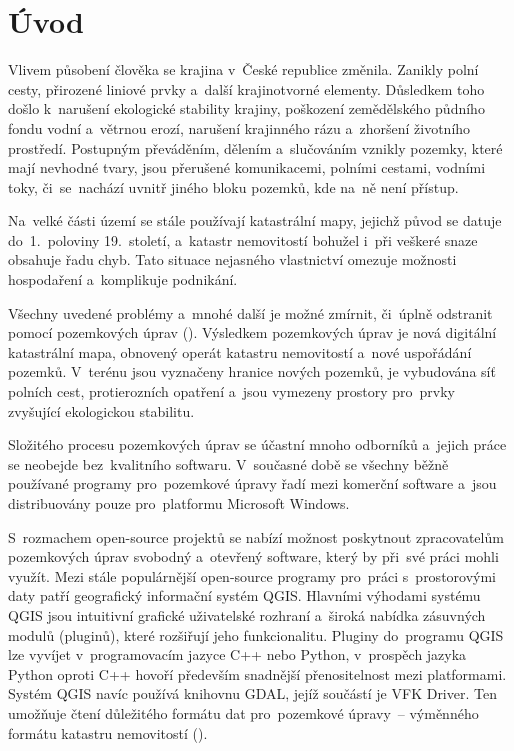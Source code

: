 \chapter{Úvod}
\label{1-uvod}

Vlivem působení člověka se krajina v~České republice změnila. Zanikly
polní cesty, přirozené liniové prvky a~další krajinotvorné
elementy. Důsledkem toho došlo k~naru\-šení ekologické stability
krajiny, poškození zemědělského půdního fondu vodní a~vě\-trnou erozí,
narušení krajinného rázu a~zhoršení životního prostředí. Postupným
převáděním, dělením a~slučováním vznikly pozemky, které mají nevhodné
tvary, jsou přerušené komunikacemi, polními cestami, vodními toky,
či~se~nachází uvnitř jiného bloku pozemků, kde na~ně není přístup.

Na~velké části území se stále používají katastrální mapy, jejichž
původ se datuje do~1.~poloviny 19.~století, a~katastr nemovitostí
bohužel i~při veškeré snaze obsahuje řadu chyb. Tato situace nejasného
vlastnictví omezuje možnosti hospodaření a~komplikuje podnikání.

Všechny uvedené problémy a~mnohé další je možné zmírnit, či~úplně
odstranit pomocí pozemkových úprav (). Výsledkem pozemkových
úprav je nová digi\-tální katastrální mapa, obnovený operát katastru
nemovitostí a~nové uspořádání pozemků. V~terénu jsou vyznačeny hranice
nových pozemků, je vybudována síť polních cest, protierozních opatření
a~jsou vymezeny prostory pro~prvky zvyšující ekologickou stabilitu.

Složitého procesu pozemkových úprav se účastní mnoho odborníků
a~jejich práce se neobejde bez~kvalitního softwaru. V~současné době se
všechny běžně používané programy pro~pozemkové úpravy řadí mezi
komerční software a~jsou distribuovány pouze pro~platformu Microsoft
Windows.

S~rozmachem open-source projektů se nabízí možnost poskytnout
zpracovatelům pozemkových úprav svobodný a~otevřený software, který by
při~své práci mohli využít. Mezi stále populárnější open-source
programy pro~práci s~prostorovými daty patří geografický informační
systém QGIS. Hlavními výhodami systému QGIS jsou intuitivní grafické
uživatelské rozhraní a~široká nabídka zásuvných modulů (pluginů),
které rozšiřují jeho funkcionalitu. Pluginy do~programu QGIS lze
vyvíjet v~programovacím jazyce C++ nebo Python, v~prospěch jazyka
Python oproti C++ ho\-voří především snadnější přenositelnost mezi
platformami. Systém QGIS navíc používá knihovnu GDAL, jejíž součástí
je VFK Driver. Ten umožňuje čtení důležitého formátu dat pro~pozemkové
úpravy~– výměnného formátu katastru nemovitostí ().

